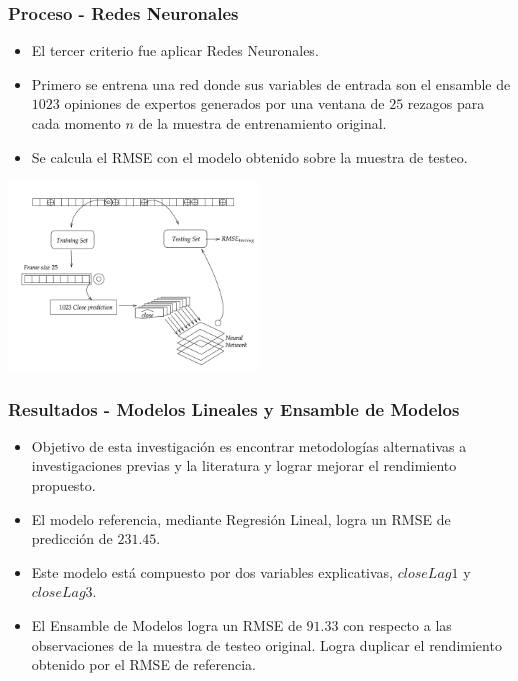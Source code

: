 \documentclass{beamer}
\begin{document}
\begin{frame}[t]
\frametitle{Proceso - Redes Neuronales}
\vfill
\begin{itemize}
\item
El tercer criterio fue aplicar Redes Neuronales. 
\item
Primero se entrena una red donde sus variables de entrada son el ensamble de $1023$ opiniones de expertos generados por una ventana de $25$ rezagos para cada momento $n$ de la muestra de entrenamiento original.
\item
Se calcula el RMSE con el modelo obtenido sobre la muestra de testeo. 
\end{itemize}
\vfill
\centering
\includegraphics[width=0.5\textwidth]{diagramNeuralNetwork}
\end{frame}

\begin{frame}[t]
\frametitle{Resultados - Modelos Lineales y Ensamble de Modelos}
\vfill
\begin{itemize}
\item
Objetivo de esta investigación es encontrar metodologías alternativas a investigaciones previas y la literatura y lograr mejorar el rendimiento propuesto. 
\item
El modelo referencia, mediante Regresión Lineal, logra un RMSE de predicción de  $231.45$.
\item
Este modelo está compuesto por dos variables explicativas, $closeLag1$ y $closeLag3$.
\item
El Ensamble de Modelos logra un RMSE de $91.33$ con respecto a las observaciones de la muestra de testeo original. Logra duplicar el rendimiento obtenido por el RMSE de referencia. 
\end{itemize}
\end{frame}
\end{document}
